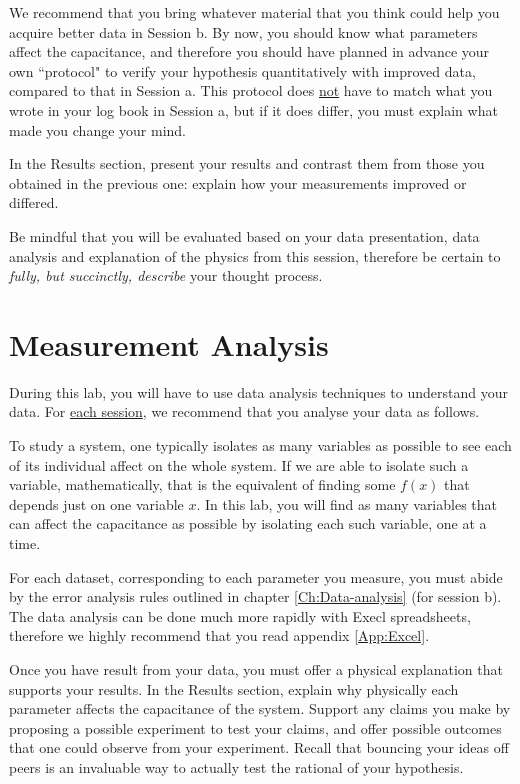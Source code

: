 \documentclass[12pt]{report}
\begin{document}
We recommend that you bring whatever material that you think could help you acquire better data in Session b. 
By now, you should know what parameters affect the capacitance, and therefore you should have planned in advance your own ``protocol" to verify your hypothesis quantitatively with improved data, compared to that in Session a. 
This protocol does \underline{not} have to match what you wrote in your log book in Session a, but if it does differ, you must explain what made you change your mind.

{\color{blue} In the Results section, present your results and contrast  them from those you obtained in the previous one: explain how your measurements improved or differed.}

{\color{blue}Be mindful that you will be evaluated based on your data presentation, data analysis and explanation of the physics from this session, therefore be certain to \textit{fully, but succinctly, describe} your thought process.} 

\section{Measurement Analysis}
\label{Sec:lab1-analysis}
During this lab, you will have to use data analysis techniques to understand your data. For \underline{each session}, we recommend that you analyse your data as follows.

To study a system, one typically isolates as many variables as possible to see each of its individual affect on the whole system. If we are able to isolate such a variable, mathematically, that is the equivalent of finding some $f(x)$ that depends just on one variable $x$. In this lab, you will find as many variables that can affect the capacitance as possible by isolating each such variable, one at a time.

For each dataset, corresponding to each parameter you measure, you must abide by the error analysis rules outlined in chapter \ref{Ch:Data-analysis} (for session b). 
The data analysis can be done much more rapidly with Execl spreadsheets, therefore we highly recommend that you read appendix \ref{App:Excel}. 

Once you have  result from your data, you must offer a physical explanation that supports your results. {\color{blue} In the Results section, explain why physically each parameter affects the capacitance of the system. Support any claims you make by proposing a possible experiment to test your claims, and offer possible outcomes that one could observe from your experiment.} Recall that bouncing your ideas off peers is an invaluable way to actually test the rational of your hypothesis.
\end{document}
